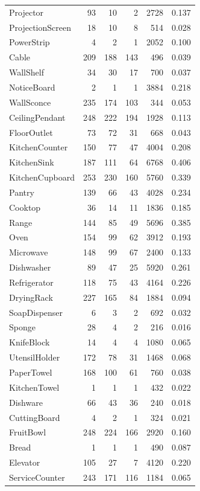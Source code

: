 \begin{longtable}{lrrr r r}
Projector & 93 & 10 & 2 & 2728 & 0.137 \\
ProjectionScreen & 18 & 10 & 8 & 514 & 0.028 \\
PowerStrip & 4 & 2 & 1 & 2052 & 0.100 \\
Cable & 209 & 188 & 143 & 496 & 0.039 \\
WallShelf & 34 & 30 & 17 & 700 & 0.037 \\
NoticeBoard & 2 & 1 & 1 & 3884 & 0.218 \\
WallSconce & 235 & 174 & 103 & 344 & 0.053 \\
CeilingPendant & 248 & 222 & 194 & 1928 & 0.113 \\
FloorOutlet & 73 & 72 & 31 & 668 & 0.043 \\
KitchenCounter & 150 & 77 & 47 & 4004 & 0.208 \\
KitchenSink & 187 & 111 & 64 & 6768 & 0.406 \\
KitchenCupboard & 253 & 230 & 160 & 5760 & 0.339 \\
Pantry & 139 & 66 & 43 & 4028 & 0.234 \\
Cooktop & 36 & 14 & 11 & 1836 & 0.185 \\
Range & 144 & 85 & 49 & 5696 & 0.385 \\
Oven & 154 & 99 & 62 & 3912 & 0.193 \\
Microwave & 148 & 99 & 67 & 2400 & 0.133 \\
Dishwasher & 89 & 47 & 25 & 5920 & 0.261 \\
Refrigerator & 118 & 75 & 43 & 4164 & 0.226 \\
DryingRack & 227 & 165 & 84 & 1884 & 0.094 \\
SoapDispenser & 6 & 3 & 2 & 692 & 0.032 \\
Sponge & 28 & 4 & 2 & 216 & 0.016 \\
KnifeBlock & 14 & 4 & 4 & 1080 & 0.065 \\
UtensilHolder & 172 & 78 & 31 & 1468 & 0.068 \\
PaperTowel & 168 & 100 & 61 & 760 & 0.038 \\
KitchenTowel & 1 & 1 & 1 & 432 & 0.022 \\
Dishware & 66 & 43 & 36 & 240 & 0.018 \\
CuttingBoard & 4 & 2 & 1 & 324 & 0.021 \\
FruitBowl & 248 & 224 & 166 & 2920 & 0.160 \\
Bread & 1 & 1 & 1 & 490 & 0.087 \\
Elevator & 105 & 27 & 7 & 4120 & 0.220 \\
ServiceCounter & 243 & 171 & 116 & 1184 & 0.065 \\

\end{longtable}
